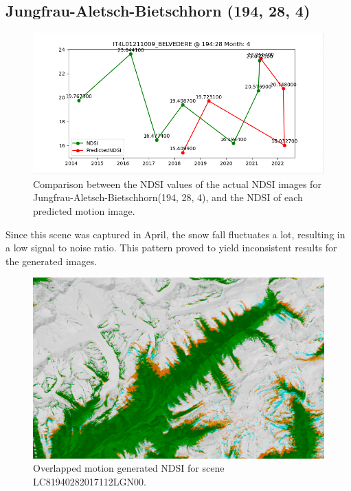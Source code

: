 \documentclass[12pt, a4paper]{report}
\begin{document}
	\subsection{Jungfrau-Aletsch-Bietschhorn (194, 28, 4)}
	
	\begin{figure}[h!]
		\centering
		\includegraphics[width=\linewidth]{../images/experiment_194284.png}
		\caption{Comparison between the NDSI values of the actual NDSI images for Jungfrau-Aletsch-Bietschhorn(194, 28, 4), and the NDSI of each predicted motion image.}
		\label{fig:jungfrau_194284}
	\end{figure}
	
	Since this scene was captured in April, the snow fall fluctuates a lot, resulting in a low signal to noise ratio. This pattern proved to yield inconsistent results for the generated images.
	
	\begin{figure}[h!]
		\centering
		\includegraphics[width=\linewidth]{../images/experiment_1940284_image.png}
		\caption{Overlapped motion generated NDSI for scene LC81940282017112LGN00.}
		\label{fig:experiment_1940284_image}
	\end{figure}
\end{document}
